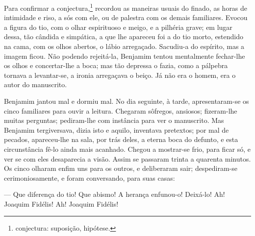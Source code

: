 Para confirmar a conjectura,\footnote{conjectura: suposição, hipótese.}
recordou as maneiras usuais do finado, as horas de intimidade e riso, a
sós com ele, ou de palestra com os demais familiares. Evocou a figura do
tio, com o olhar espirituoso e meigo, e a pilhéria grave; em lugar
dessa, tão cândida e simpática, a que lhe apareceu foi a do tio morto,
estendido na cama, com os olhos abertos, o lábio arregaçado. Sacudiu-a
do espírito, mas a imagem ficou. Não podendo rejeitá-la, Benjamim tentou
mentalmente fechar-lhe os olhos e concertar-lhe a boca; mas tão depressa
o fazia, como a pálpebra tornava a levantar-se, a ironia arregaçava o
beiço. Já não era o homem, era o autor do manuscrito.

Benjamim jantou mal e dormiu mal. No dia seguinte, à tarde,
apresentaram-se os cinco familiares para ouvir a leitura. Chegaram
sôfregos, ansiosos; fizeram-lhe muitas perguntas; pediram-lhe com
instância para ver o manuscrito. Mas Benjamim tergiversava, dizia isto e
aquilo, inventava pretextos; por mal de pecados, apareceu-lhe na sala,
por trás deles, a eterna boca do defunto, e esta circunstância fê-lo
ainda mais acanhado. Chegou a mostrar-se frio, para ficar só, e ver se
com eles desaparecia a visão. Assim se passaram trinta a quarenta
minutos. Os cinco olharam enfim uns para os outros, e deliberaram sair;
despediram-se cerimoniosamente, e foram conversando, para suas casas:

--- Que diferença do tio! Que abismo! A herança enfunou-o! Deixá-lo! Ah!
Joaquim Fidélis! Ah! Joaquim Fidélis!

